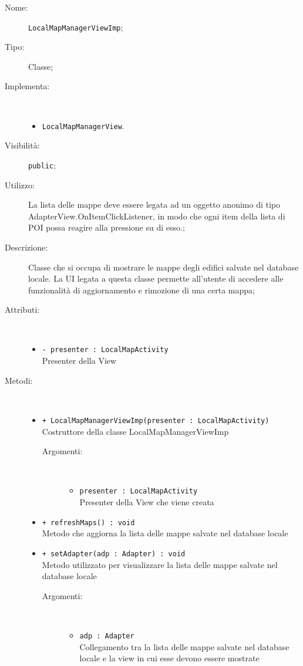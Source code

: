 \documentclass[../DefinizioneDiProdotto.tex]{subfiles}
\begin{document}
    \begin{description}
\item[Nome:] \texttt{LocalMapManagerViewImp};
\item[Tipo:] Classe;
\item[Implementa:] \
\begin{itemize}
\item \texttt{LocalMapManagerView}.

\end{itemize}
\item[Visibilità:] \texttt{public};
\item[Utilizzo:] La lista delle mappe deve essere legata ad un oggetto anonimo di tipo AdapterView.OnItemClickListener, in modo che ogni item della lista di POI possa reagire alla pressione su di esso.;
\item[Descrizione:] Classe che si occupa di mostrare le mappe degli edifici salvate nel database locale. La UI legata a questa classe permette all'utente di accedere alle funzionalità di aggiornamento e rimozione di una certa mappa;
\item[Attributi:] \
\begin{itemize}
\item \texttt{- presenter : LocalMapActivity}\\
Presenter della View

\end{itemize}
\item[Metodi:] \
\begin{itemize}
\item \texttt{+ LocalMapManagerViewImp(presenter : LocalMapActivity)}\\
Costruttore della classe LocalMapManagerViewImp
 \begin{description}
\item[Argomenti:] \
\begin{itemize}
\item \texttt{presenter : LocalMapActivity}\\
Presenter della View che viene creata\end{itemize}
\end{description}
\item \texttt{+ refreshMaps() : void}\\
Metodo che aggiorna la lista delle mappe salvate nel database locale
 \item \texttt{+ setAdapter(adp : Adapter) : void}\\
Metodo utilizzato per visualizzare la lista delle mappe salvate nel database locale
 \begin{description}
\item[Argomenti:] \
\begin{itemize}
\item \texttt{adp : Adapter}\\
Collegamento tra la lista delle mappe salvate nel database locale e la view in cui esse devono essere mostrate\end{itemize}
\end{description}
\end{itemize}
\end{description}
\end{document}
